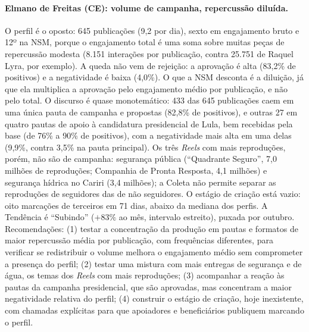 \paragraph*{Elmano de Freitas (CE): volume de campanha, repercussão diluída.} O perfil é o oposto: 645 publicações (9,2 por dia), sexto em engajamento bruto e 12º na NSM, porque o engajamento total é uma soma sobre muitas peças de repercussão modesta (8.151 interações por publicação, contra 25.751 de Raquel Lyra, por exemplo). A queda não vem de rejeição: a aprovação é alta (83,2\% de positivos) e a negatividade é baixa (4,0\%). O que a NSM desconta é a diluição, já que ela multiplica a aprovação pelo engajamento médio por publicação, e não pelo total. O discurso é quase monotemático: 433 das 645 publicações caem em uma única pauta de campanha e propostas (82,8\% de positivos), e outras 27 em quatro pautas de apoio à candidatura presidencial de Lula, bem recebidas pela base (de 76\% a 90\% de positivos), com a negatividade mais alta em uma delas (9,9\%, contra 3,5\% na pauta principal). Os três \emph{Reels} com mais reproduções, porém, não são de campanha: segurança pública (``Quadrante Seguro'', 7,0 milhões de reproduções; Companhia de Pronta Resposta, 4,1 milhões) e segurança hídrica no Cariri (3,4 milhões); a Coleta não permite separar as reproduções de seguidores das de não seguidores. O estágio de criação está vazio: oito marcações de terceiros em 71 dias, abaixo da mediana dos perfis. A Tendência é ``Subindo'' ($+83\%$ ao mês, intervalo estreito), puxada por outubro. Recomendações: (1) testar a concentração da produção em pautas e formatos de maior repercussão média por publicação, com frequências diferentes, para verificar se redistribuir o volume melhora o engajamento médio sem comprometer a presença do perfil; (2) testar uma mistura com mais entregas de segurança e de água, os temas dos \emph{Reels} com mais reproduções; (3) acompanhar a reação às pautas da campanha presidencial, que são aprovadas, mas concentram a maior negatividade relativa do perfil; (4) construir o estágio de criação, hoje inexistente, com chamadas explícitas para que apoiadores e beneficiários publiquem marcando o perfil.

